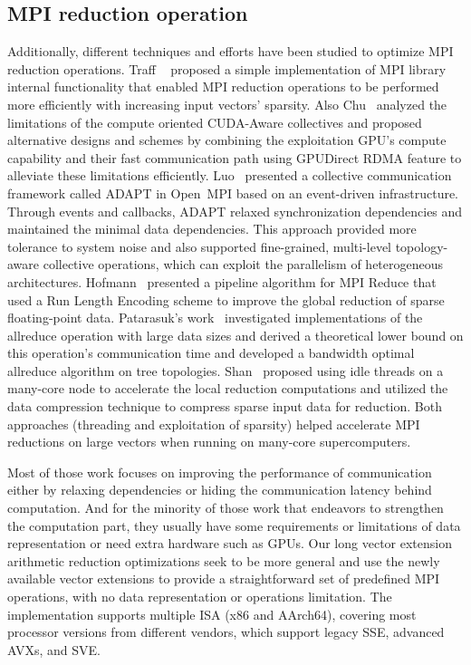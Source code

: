 \documentclass[5p,times,twocolumn]{elsarticle}
\newcommand{\ompi}[0]{Open~MPI\xspace}
\newcommand{\mpi}[0]{\textsc{MPI}\xspace}
\begin{document}
\subsection{\mpi reduction operation}
Additionally, different techniques and
efforts have been studied to optimize \mpi reduction operations. Traff
~\cite{NeutralMPIReduction} proposed a simple implementation of MPI library
internal functionality that enabled MPI reduction operations to be performed
more efficiently with increasing input vectors' sparsity.
%
Also Chu~\cite{gpu-reduce} analyzed the limitations of the compute oriented CUDA-Aware
collectives and proposed alternative designs and schemes by combining the exploitation GPU's
compute capability and their fast communication
path using GPUDirect RDMA feature to alleviate these limitations efficiently.
%
Luo~\cite{Luo-adapt} presented a collective communication framework called ADAPT
in \ompi based on an event-driven infrastructure. Through events and callbacks,
ADAPT relaxed synchronization dependencies and maintained the minimal data dependencies.
This approach provided more tolerance to system noise and also supported fine-grained,
multi-level topology-aware collective operations, which can exploit the
parallelism of heterogeneous architectures.
%
Hofmann~\cite{sparse-reduction} presented a pipeline algorithm for MPI Reduce
that used a Run Length Encoding scheme to improve the global reduction of sparse
floating-point data.
Patarasuk's work~\cite{allreduce-optimal} investigated implementations of the allreduce operation
with large data sizes and derived a theoretical lower bound on this operation's communication time and developed
a bandwidth optimal allreduce algorithm on tree topologies.
%
Shan~\cite{shan-reduce} proposed using idle threads on a many-core node to accelerate
the local reduction computations and utilized the data compression technique to compress sparse input data for reduction.
Both approaches (threading and exploitation
of sparsity) helped accelerate MPI reductions on large vectors when
running on many-core supercomputers.
%

Most of those work focuses on improving the performance of
communication either by relaxing dependencies or hiding the communication latency behind computation.
And for the minority of those work that endeavors to strengthen the computation part,
they usually have some requirements or limitations of data
representation or need extra hardware such as GPUs.
Our long vector extension arithmetic reduction
optimizations seek to be more general and use the newly available vector extensions to provide a
straightforward set of predefined MPI operations, with no data representation or operations limitation.
The implementation supports multiple ISA (x86 and AArch64), covering most processor versions from different vendors,
which support legacy SSE, advanced AVXs, and SVE.
\end{document}
